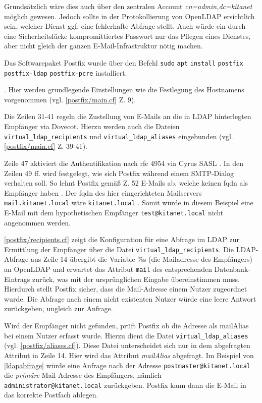 Grundsätzlich wäre dies auch über den zentralen Account \textit{cn=admin,dc=kitanet} möglich gewesen. 
Jedoch sollte in der Protokollierung von OpenLDAP ersichtlich sein, welcher Dienst ggf. eine fehlerhafte Abfrage stellt. 
Auch würde ein durch eine Sicherheitslücke kompromittiertes Passwort nur das Pflegen eines Dienstes, aber nicht gleich der ganzen E-Mail-Infrastruktur nötig machen.

Das Softwarepaket Postfix wurde über den Befehl \verb+sudo+ \verb+apt+ \verb+install+ \verb+postfix+ \\ \verb+postfix-ldap+ \verb+postfix-pcre+ installiert. 

 \citep[][308]{Deimeke2019}.
Hier werden grundlegende Einstellungen wie die Festlegung des Hostnamens vorgenommen (vgl. \autoref{postfix/main.cf} Z. 9).

Die Zeilen 31-41 regeln die Zustellung von E-Mails an die in LDAP hinterlegten Empfänger via Dovecot. Hierzu werden auch die  Dateien \verb+virtual_ldap_recipients+ und \verb+virtual_ldap_aliases+ eingebunden (vgl. \autoref{postfix/main.cf} Z. 39-41).

Zeile 47 aktiviert die Authentifikation nach \ac{rfc} 4954 via Cyrus SASL \citep[vgl.][3]{rfc4954}.
In den Zeilen 49 ff. wird festgelegt, wie sich Postfix während einem SMTP-Dialog verhalten soll.
So lehnt Postfix \zb gemäß Z. 52 E-Mails ab, welche keinen \ac{fqdn} als Empfänger haben \citep[vgl.][]{postfixfqdn}. 
Der \ac{fqdn} des hier eingerichteten Mailservers \verb+mail.kitanet.local+ wäre \zb \verb+kitanet.local+ \citep[vgl.][]{fqdn}. 
Somit würde in diesem Beispiel eine E-Mail mit dem hypothetischen Empfänger \verb+test@kitanet.local+ nicht angenommen werden.

\autoref{postfix/recipients.cf} zeigt die Konfiguration für eine Abfrage im LDAP zur Ermittlung der Empfänger über die Datei \verb+virtual_ldap_recipients+.
Die LDAP-Abfrage aus Zeile 14 übergibt die Variable \%s (die Mailadresse des Empfängers) an OpenLDAP und erwartet das Attribut \verb+mail+ des entsprechenden Datenbank-Eintrags zurück, was mit der ursprünglichen Eingabe übereinstimmen muss. Hierdurch stellt Postfix sicher, dass die Mail-Adresse einem Nutzer zugeordnet wurde. Die Abfrage nach einem nicht existenten Nutzer würde eine leere Antwort zurückgeben, ungleich zur Anfrage.

Wird der Empfänger nicht gefunden, prüft Postfix ob die Adresse als mailAlias bei einem Nutzer erfasst wurde. Hierzu dient die Datei \verb+virtual_ldap_aliases+ (vgl. \autoref{postfix/aliases.cf}). 
Diese Datei unterscheidet sich nur in dem abgefragten Attribut in Zeile 14. 
Hier wird das Attribut \textit{mailAlias} abgefragt. 
Im Beispiel von \autoref{ldapabfrage} würde eine Anfrage nach der Adresse \verb+postmaster@kitanet.local+ die \textit{primäre} Mail-Adresse des Empfängers, nämlich \verb+administrator@kitanet.local+ zurückgeben. 
Postfix kann dann die E-Mail in das korrekte Postfach ablegen.

